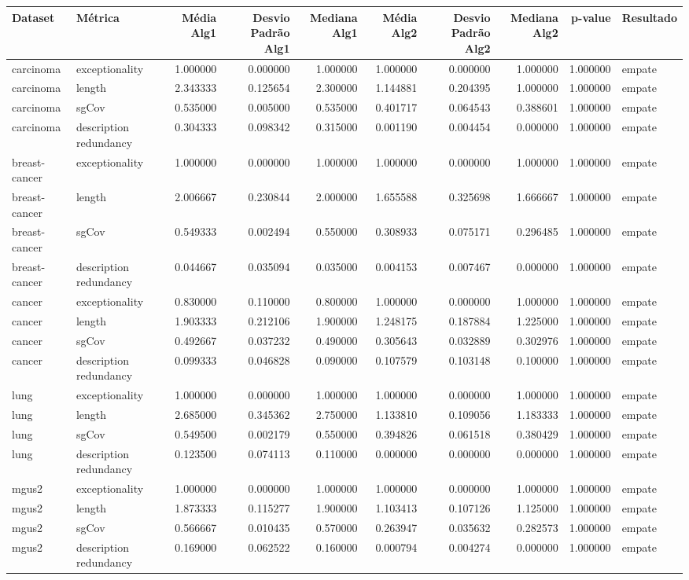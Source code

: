 \begin{tabular}{llrrrrrrrl}
\toprule
Dataset & Métrica & Média Alg1 & Desvio Padrão Alg1 & Mediana Alg1 & Média Alg2 & Desvio Padrão Alg2 & Mediana Alg2 & p-value & Resultado \\
\midrule
carcinoma & exceptionality & 1.000000 & 0.000000 & 1.000000 & 1.000000 & 0.000000 & 1.000000 & 1.000000 & empate \\
carcinoma & length & 2.343333 & 0.125654 & 2.300000 & 1.144881 & 0.204395 & 1.000000 & 1.000000 & empate \\
carcinoma & sgCov & 0.535000 & 0.005000 & 0.535000 & 0.401717 & 0.064543 & 0.388601 & 1.000000 & empate \\
carcinoma & description redundancy & 0.304333 & 0.098342 & 0.315000 & 0.001190 & 0.004454 & 0.000000 & 1.000000 & empate \\
breast-cancer & exceptionality & 1.000000 & 0.000000 & 1.000000 & 1.000000 & 0.000000 & 1.000000 & 1.000000 & empate \\
breast-cancer & length & 2.006667 & 0.230844 & 2.000000 & 1.655588 & 0.325698 & 1.666667 & 1.000000 & empate \\
breast-cancer & sgCov & 0.549333 & 0.002494 & 0.550000 & 0.308933 & 0.075171 & 0.296485 & 1.000000 & empate \\
breast-cancer & description redundancy & 0.044667 & 0.035094 & 0.035000 & 0.004153 & 0.007467 & 0.000000 & 1.000000 & empate \\
cancer & exceptionality & 0.830000 & 0.110000 & 0.800000 & 1.000000 & 0.000000 & 1.000000 & 1.000000 & empate \\
cancer & length & 1.903333 & 0.212106 & 1.900000 & 1.248175 & 0.187884 & 1.225000 & 1.000000 & empate \\
cancer & sgCov & 0.492667 & 0.037232 & 0.490000 & 0.305643 & 0.032889 & 0.302976 & 1.000000 & empate \\
cancer & description redundancy & 0.099333 & 0.046828 & 0.090000 & 0.107579 & 0.103148 & 0.100000 & 1.000000 & empate \\
lung & exceptionality & 1.000000 & 0.000000 & 1.000000 & 1.000000 & 0.000000 & 1.000000 & 1.000000 & empate \\
lung & length & 2.685000 & 0.345362 & 2.750000 & 1.133810 & 0.109056 & 1.183333 & 1.000000 & empate \\
lung & sgCov & 0.549500 & 0.002179 & 0.550000 & 0.394826 & 0.061518 & 0.380429 & 1.000000 & empate \\
lung & description redundancy & 0.123500 & 0.074113 & 0.110000 & 0.000000 & 0.000000 & 0.000000 & 1.000000 & empate \\
mgus2 & exceptionality & 1.000000 & 0.000000 & 1.000000 & 1.000000 & 0.000000 & 1.000000 & 1.000000 & empate \\
mgus2 & length & 1.873333 & 0.115277 & 1.900000 & 1.103413 & 0.107126 & 1.125000 & 1.000000 & empate \\
mgus2 & sgCov & 0.566667 & 0.010435 & 0.570000 & 0.263947 & 0.035632 & 0.282573 & 1.000000 & empate \\
mgus2 & description redundancy & 0.169000 & 0.062522 & 0.160000 & 0.000794 & 0.004274 & 0.000000 & 1.000000 & empate \\
\bottomrule
\end{tabular}
